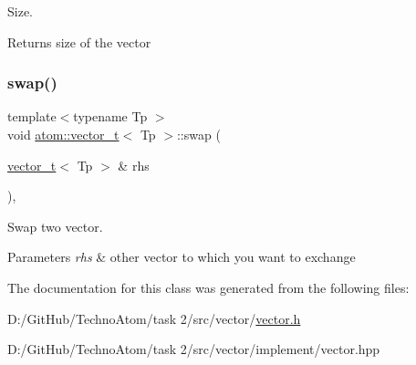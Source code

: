 Size. 

\begin{DoxyReturn}{Returns}
size of the vector 
\end{DoxyReturn}
\mbox{\label{classatom_1_1vector__t_a37462493cd88e3c610cc0004b9bb0b57}} 
\subsubsection{\texorpdfstring{swap()}{swap()}}
{\footnotesize\ttfamily template$<$typename Tp $>$ \\
void \hyperlink{classatom_1_1vector__t}{atom\+::vector\+\_\+t}$<$ Tp $>$\+::swap (\begin{DoxyParamCaption}\item[{\hyperlink{classatom_1_1vector__t}{vector\+\_\+t}$<$ Tp $>$ \&}]{rhs }\end{DoxyParamCaption})\hspace{0.3cm}{\ttfamily [inline]}, {\ttfamily [noexcept]}}



Swap two vector. 


\begin{DoxyParams}{Parameters}
{\em rhs} & other vector to which you want to exchange \\
\hline
\end{DoxyParams}


The documentation for this class was generated from the following files\+:\begin{DoxyCompactItemize}
\item 
D\+:/\+Git\+Hub/\+Techno\+Atom/task 2/src/vector/\hyperlink{vector_8h}{vector.\+h}\item 
D\+:/\+Git\+Hub/\+Techno\+Atom/task 2/src/vector/implement/vector.\+hpp\end{DoxyCompactItemize}
